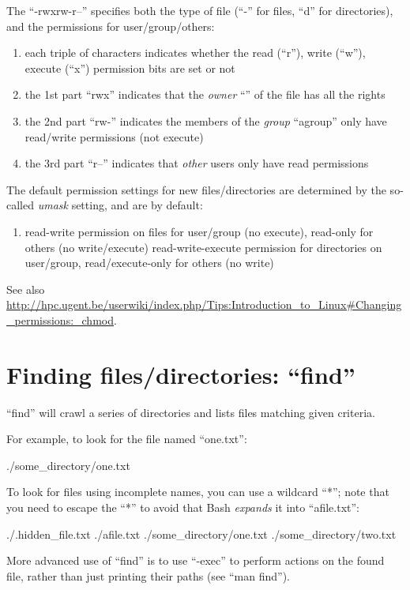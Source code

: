 The ``-rwxrw-r--'' specifies both the type of file (``-'' for files, ``d'' for directories), and the permissions for user/group/others:

\begin{enumerate}
\item each triple of characters indicates whether the read (``r''), write (``w''), execute (``x'') permission bits are set or not 
\item the 1st part ``rwx'' indicates that the \emph{owner} ``\userid'' of the file has all the rights
\item the 2nd part ``rw-'' indicates the members of the \emph{group} ``agroup'' only have read/write permissions (not execute)
\item the 3rd part ``r--'' indicates that \emph{other} users only have read permissions
\end{enumerate}

The default permission settings for new files/directories are determined by the so-called \emph{umask} setting, and are by default:

\begin{enumerate}
\item read-write permission on files for user/group (no execute), read-only for others (no write/execute)
\tem read-write-execute permission for directories on user/group, read/execute-only for others (no write)
\end{enumerate}

See also \url{http://hpc.ugent.be/userwiki/index.php/Tips:Introduction_to_Linux#Changing_permissions:_chmod}.

\section{Finding files/directories: ``find''}

``find'' will crawl a series of directories and lists files matching given criteria.

For example, to look for the file named ``one.txt'':

\begin{prompt}
./some_directory/one.txt
\end{prompt}

To look for files using incomplete names, you can use a wildcard ``*''; note
that you need to escape the ``*'' to avoid that Bash \emph{expands} it into
``afile.txt'':

\begin{prompt}
./.hidden_file.txt
./afile.txt
./some_directory/one.txt
./some_directory/two.txt 
\end{prompt}

More advanced use of ``find'' is to use ``-exec'' to perform actions on the
found file, rather than just printing their paths (see ``man find'').
